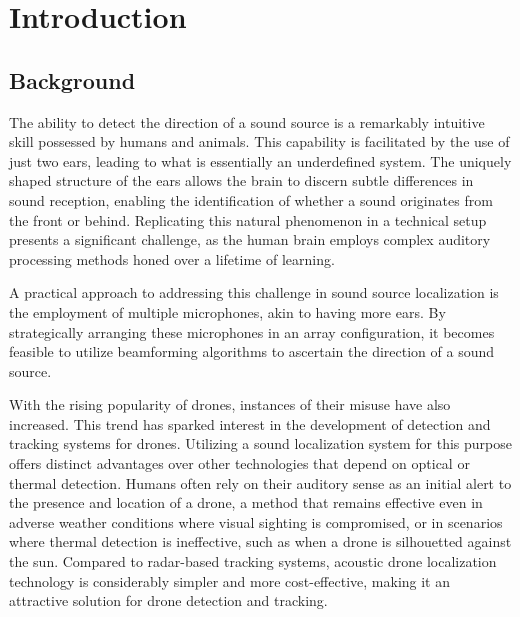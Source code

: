 \chapter{Introduction}
\section{Background}
The ability to detect the direction of a sound source is a remarkably intuitive skill possessed by humans and animals.
This capability is facilitated by the use of just two ears, leading to what is essentially an underdefined system.
The uniquely shaped structure of the ears allows the brain to discern subtle differences in sound reception,
enabling the identification of whether a sound originates from the front or behind.
Replicating this natural phenomenon in a technical setup presents a significant challenge,
as the human brain employs complex auditory processing methods honed over a lifetime of learning.

A practical approach to addressing this challenge in sound source localization is the employment of multiple microphones, akin to having more ears.
By strategically arranging these microphones in an array configuration, it becomes feasible to utilize beamforming algorithms to ascertain the direction of a sound source.

With the rising popularity of drones, instances of their misuse have also increased.
This trend has sparked interest in the development of detection and tracking systems for drones.
Utilizing a sound localization system for this purpose offers distinct advantages over other technologies that depend on optical or thermal detection.
Humans often rely on their auditory sense as an initial alert to the presence and location of a drone,
a method that remains effective even in adverse weather conditions where visual sighting is compromised,
or in scenarios where thermal detection is ineffective, such as when a drone is silhouetted against the sun.
Compared to radar-based tracking systems, acoustic drone localization technology is considerably simpler and more cost-effective,
making it an attractive solution for drone detection and tracking.

\newpage
